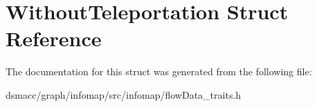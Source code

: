 \hypertarget{structWithoutTeleportation}{}\section{Without\+Teleportation Struct Reference}
\label{structWithoutTeleportation}


The documentation for this struct was generated from the following file\+:\begin{DoxyCompactItemize}
\item 
dsmacc/graph/infomap/src/infomap/flow\+Data\+\_\+traits.\+h\end{DoxyCompactItemize}
